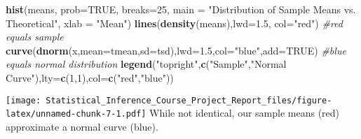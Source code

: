 \documentclass[]{article}
\newenvironment{Shaded}{\begin{snugshade}}{\end{snugshade}}
\newcommand{\KeywordTok}[1]{\textcolor[rgb]{0.13,0.29,0.53}{\textbf{#1}}}
\newcommand{\DataTypeTok}[1]{\textcolor[rgb]{0.13,0.29,0.53}{#1}}
\newcommand{\DecValTok}[1]{\textcolor[rgb]{0.00,0.00,0.81}{#1}}
\newcommand{\FloatTok}[1]{\textcolor[rgb]{0.00,0.00,0.81}{#1}}
\newcommand{\StringTok}[1]{\textcolor[rgb]{0.31,0.60,0.02}{#1}}
\newcommand{\CommentTok}[1]{\textcolor[rgb]{0.56,0.35,0.01}{\textit{#1}}}
\newcommand{\OtherTok}[1]{\textcolor[rgb]{0.56,0.35,0.01}{#1}}
\newcommand{\NormalTok}[1]{#1}
\begin{document}
\begin{Shaded}
\begin{Highlighting}[]
\KeywordTok{hist}\NormalTok{(means, }\DataTypeTok{prob=}\OtherTok{TRUE}\NormalTok{, }\DataTypeTok{breaks=}\DecValTok{25}\NormalTok{, }\DataTypeTok{main =} \StringTok{"Distribution of Sample Means vs. Theoretical"}\NormalTok{, }\DataTypeTok{xlab =} \StringTok{"Mean"}\NormalTok{) }
\KeywordTok{lines}\NormalTok{(}\KeywordTok{density}\NormalTok{(means),}\DataTypeTok{lwd=}\FloatTok{1.5}\NormalTok{, }\DataTypeTok{col=}\StringTok{"red"}\NormalTok{) }\CommentTok{#red equals sample}
\KeywordTok{curve}\NormalTok{(}\KeywordTok{dnorm}\NormalTok{(x,}\DataTypeTok{mean=}\NormalTok{tmean,}\DataTypeTok{sd=}\NormalTok{tsd),}\DataTypeTok{lwd=}\FloatTok{1.5}\NormalTok{,}\DataTypeTok{col=}\StringTok{"blue"}\NormalTok{,}\DataTypeTok{add=}\OtherTok{TRUE}\NormalTok{) }\CommentTok{#blue equals normal distribution}
\KeywordTok{legend}\NormalTok{(}\StringTok{"topright"}\NormalTok{,}\KeywordTok{c}\NormalTok{(}\StringTok{"Sample"}\NormalTok{,}\StringTok{"Normal Curve"}\NormalTok{),}\DataTypeTok{lty=}\KeywordTok{c}\NormalTok{(}\DecValTok{1}\NormalTok{,}\DecValTok{1}\NormalTok{),}\DataTypeTok{col=}\KeywordTok{c}\NormalTok{(}\StringTok{"red"}\NormalTok{,}\StringTok{"blue"}\NormalTok{))}
\end{Highlighting}
\end{Shaded}

\texttt{[image: Statistical\_Inference\_Course\_Project\_Report\_files/figure-latex/unnamed-chunk-7-1.pdf]}
While not identical, our sample means (red) approximate a normal curve
(blue).
\end{document}

